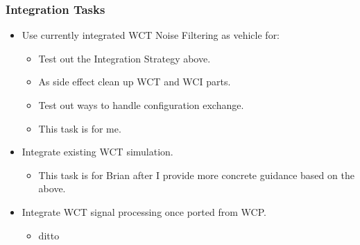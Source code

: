 \documentclass[xcolor=dvipsnames]{beamer}
\begin{document}
\begin{frame}
  \frametitle{Integration Tasks}

  \begin{itemize}
  \item Use currently integrated WCT Noise Filtering as vehicle for:
    \begin{itemize}
    \item Test out the Integration Strategy above.
    \item As side effect clean up WCT and WCI parts.
    \item Test out ways to handle configuration exchange. 
    \item This task is for me.
    \end{itemize}
  \item Integrate existing WCT simulation.
    \begin{itemize}
    \item This task is for Brian after I provide more concrete
      guidance based on the above.
    \end{itemize}
  \item Integrate WCT signal processing once ported from WCP.
    \begin{itemize}
    \item ditto
    \end{itemize}
  \end{itemize}
\end{frame}
\end{document}
